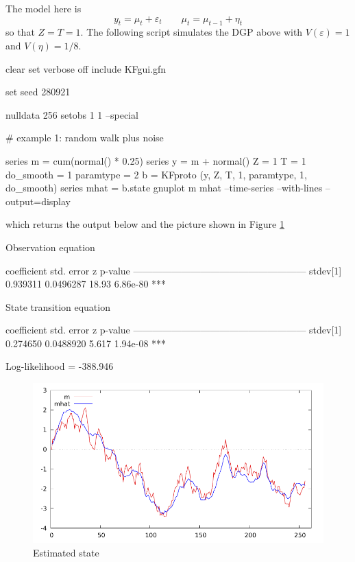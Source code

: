 \documentclass[a4paper]{article}
\begin{document}
The model here is
\[
  y_t = \mu_t + \varepsilon_t \qquad \mu_t = \mu_{t-1} + \eta_t
\]
so that $Z = T = 1$. The following script simulates the DGP above
with $V(\varepsilon) = 1$ and $V(\eta) = 1/8$.

\begin{code}
clear
set verbose off
include KFgui.gfn

set seed 280921

nulldata 256
setobs 1 1 --special

# example 1: random walk plus noise

series m = cum(normal() * 0.25)
series y = m + normal()
Z = {1}
T = {1}
do_smooth = 1
paramtype = 2
b = KFproto (y, Z, T, 1, paramtype, 1, do_smooth)
series mhat = b.state
gnuplot m mhat --time-series --with-lines --output=display
\end{code}

which returns the output below and the picture shown in Figure
\ref{fig:state}

\begin{code}
Observation equation

             coefficient   std. error     z     p-value 
  ------------------------------------------------------
  stdev[1]    0.939311     0.0496287    18.93   6.86e-80 ***


State transition equation

             coefficient   std. error     z     p-value 
  ------------------------------------------------------
  stdev[1]    0.274650     0.0488920    5.617   1.94e-08 ***

  Log-likelihood = -388.946
\end{code}


\begin{figure}[hb]
  \centering
  \includegraphics[scale=0.7]{state}
  \caption{Estimated state}\label{fig:state}
\end{figure}
\end{document}
